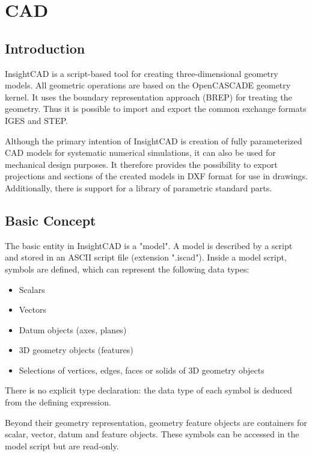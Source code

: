 \section{CAD}

\subsection{Introduction}

InsightCAD is a script-based tool for creating three-dimensional geometry models. 
All geometric operations are based on the OpenCASCADE geometry kernel. 
It uses the boundary representation approach (BREP) for treating the geometry. Thus it is possible to import and export the common exchange formats IGES and STEP.

Although the primary intention of InsightCAD is creation of
fully parameterized CAD models for systematic numerical simulations, it
can also be used for mechanical design purposes. 
It therefore provides the possibility to export projections and sections of the created models in DXF format for use in drawings. 
Additionally, there is support for a library of parametric standard parts.

\subsection{Basic Concept}

The basic entity in InsightCAD is a "model". A model is
described by a script and stored in an ASCII script file (extension
".iscad"). Inside a model script, symbols are defined, which can
represent the following data types:

\begin{itemize}
\item Scalars
\item Vectors
\item Datum objects (axes, planes)
\item 3D geometry objects (features)
\item Selections of vertices, edges, faces or solids of 3D geometry objects
\end{itemize}

There is no explicit type declaration: the data type of each symbol is
deduced from the defining expression.

Beyond their geometry representation, geometry feature objects are containers for scalar, vector, datum and feature objects. 
These symbols can be accessed in the model script but are read-only.


